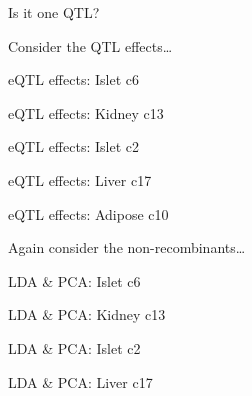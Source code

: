 \documentclass[12pt,t]{beamer}
\begin{document}
\begin{frame}[c]{}
\centerline{\Large \ticolor Is it one QTL?}
\end{frame}


\begin{frame}[c]{}
\centerline{\Large \ticolor Consider the QTL effects\dots}
\end{frame}



\begin{frame}[c]{eQTL effects: Islet c6}
\end{frame}

\begin{frame}[c]{eQTL effects: Kidney c13}
\end{frame}

\begin{frame}[c]{eQTL effects: Islet c2}
\end{frame}

\begin{frame}[c]{eQTL effects: Liver c17}
\end{frame}

\begin{frame}[c]{eQTL effects: Adipose c10}
\end{frame}



\begin{frame}[c]{}
\centerline{\Large \ticolor Again consider the non-recombinants\dots}
\end{frame}


\begin{frame}[c]{LDA \& PCA: Islet c6}
\end{frame}

\begin{frame}[c]{LDA \& PCA: Kidney c13}
\end{frame}

\begin{frame}[c]{LDA \& PCA: Islet c2}
\end{frame}

\begin{frame}[c]{LDA \& PCA: Liver c17}
\end{frame}
\end{document}
